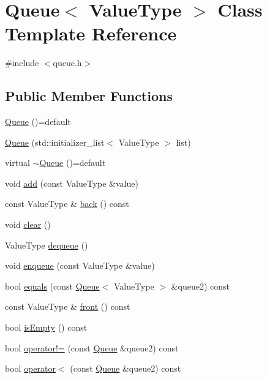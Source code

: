 \hypertarget{classQueue}{}\section{Queue$<$ Value\+Type $>$ Class Template Reference}
\label{classQueue}


{\ttfamily \#include $<$queue.\+h$>$}

\subsection*{Public Member Functions}
\begin{DoxyCompactItemize}
\item 
\mbox{\hyperlink{classQueue_a661ad33bec307cc237c318c39970e78f}{Queue}} ()=default
\item 
\mbox{\hyperlink{classQueue_a0ad6572f7c8e567d440ef6735d2f4a32}{Queue}} (std\+::initializer\+\_\+list$<$ Value\+Type $>$ list)
\item 
virtual \mbox{\hyperlink{classQueue_ae83407b742657a6444a1ce04f5ad6606}{$\sim$\+Queue}} ()=default
\item 
void \mbox{\hyperlink{classQueue_ab901606bf3a8019c986f0cf9a9f298dc}{add}} (const Value\+Type \&value)
\item 
const Value\+Type \& \mbox{\hyperlink{classQueue_adc761c91bdacd01bed5c96e25fd9486a}{back}} () const
\item 
void \mbox{\hyperlink{classQueue_ac8bb3912a3ce86b15842e79d0b421204}{clear}} ()
\item 
Value\+Type \mbox{\hyperlink{classQueue_aaee07e371e2370e76e6c42bada727ba2}{dequeue}} ()
\item 
void \mbox{\hyperlink{classQueue_a663f69ed5d98f3f167202e9b2d7e7a9a}{enqueue}} (const Value\+Type \&value)
\item 
bool \mbox{\hyperlink{classQueue_aafa8534374662afc7fedc3e1ffb72c08}{equals}} (const \mbox{\hyperlink{classQueue}{Queue}}$<$ Value\+Type $>$ \&queue2) const
\item 
const Value\+Type \& \mbox{\hyperlink{classQueue_a02aaa52ad7a120201f6dd3e90eff737f}{front}} () const
\item 
bool \mbox{\hyperlink{classQueue_acf82f9b2937375c7b1cf3dccb3df3312}{is\+Empty}} () const
\item 
bool \mbox{\hyperlink{classQueue_a385dafd253f98c0a2cec02b5c077cc2e}{operator!=}} (const \mbox{\hyperlink{classQueue}{Queue}} \&queue2) const
\item 
bool \mbox{\hyperlink{classQueue_ad2043e6acdbba5a438b040a2ceda3db7}{operator$<$}} (const \mbox{\hyperlink{classQueue}{Queue}} \&queue2) const

\end{DoxyCompactItemize}
